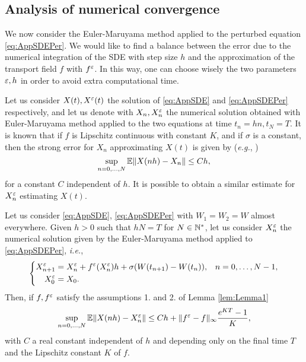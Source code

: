 \subsection{Analysis of numerical convergence}

We now consider the Euler-Maruyama method applied to the perturbed equation \eqref{eq:AppSDEPer}. We would like to find a balance between the error due to the numerical integration of the SDE with step size $h$ and the approximation of the transport field $f$ with $f^\varepsilon$. In this way, one can choose wisely the two parameters $\varepsilon, h$ in order to avoid extra computational time.

\noindent Let us consider $X(t), X^\varepsilon(t)$ the solution of \eqref{eq:AppSDE} and \eqref{eq:AppSDEPer} respectively, and let us denote with $X_n, X_n^\varepsilon$ the numerical solution obtained with Euler-Maruyama method applied to the two equations at time $t_n = hn, t_N = T$. It is known that if $f$ is Lipschitz continuous with constant $K$, and if $\sigma$ is a constant, then the strong error for $X_n$ approximating $X(t)$ is given by (\textit{e.g.}, \cite[Chapter 10]{Kloeden1992})
\begin{equation}\label{eq:StrongEM}
	\sup_{n = 0, \dots, N} \mathbb{E} \|X(nh) - X_n\| \leq C h,
\end{equation}
for a constant $C$ independent of $h$. It is possible to obtain a similar estimate for $X_n^\varepsilon$ estimating $X(t)$. 
\begin{theorem}\label{thm:StrongConv} Let us consider \eqref{eq:AppSDE}, \eqref{eq:AppSDEPer} with $W_1 = W_2 = W$ almost everywhere. Given $h > 0$ such that $hN = T$ for $N \in \mathbb{N}^*$, let us consider $X_n^\varepsilon$ the numerical solution given by the Euler-Maruyama method applied to \eqref{eq:AppSDEPer}, \textit{i.e.},
\begin{equation*}
\left \{
\begin{aligned}
	X^\varepsilon_{n+1} &= X^\varepsilon_n + f^\varepsilon(X^\varepsilon_n)h + \sigma (W(t_{n+1}) - W(t_n)), && n = 0, \dots, N - 1, \\
	X^\varepsilon_0 &= X_0.
\end{aligned} \right .
\end{equation*}
Then, if $f, f^\varepsilon$ satisfy the assumptions 1. and 2. of Lemma \ref{lem:Lemma1}
\begin{equation}\label{eq:StrongConvEpl}
	\sup_{n = 0, \dots, N} \mathbb{E} \|X(nh) - X^\varepsilon_n\| \leq C h +  \|f^\varepsilon - f\|_{\infty} \frac{e^{KT} - 1}{K}, 
\end{equation}
with $C$ a real constant independent of $h$ and depending only on the final time $T$ and the Lipschitz constant $K$ of $f$.
\end{theorem}

